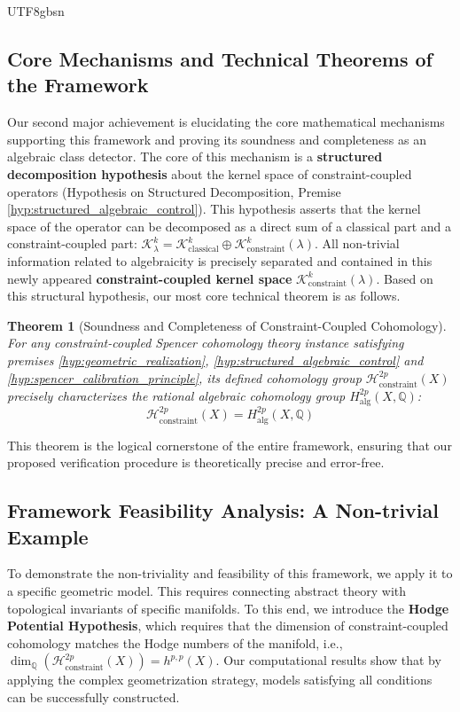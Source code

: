 \documentclass[a4paper,12pt]{extarticle}
\newtheorem{theorem}{Theorem}[section]
\theoremstyle{definition}
\begin{document}
\begin{CJK}{UTF8}{gbsn}
\subsection{Core Mechanisms and Technical Theorems of the Framework}

Our second major achievement is elucidating the core mathematical mechanisms supporting this framework and proving its soundness and completeness as an algebraic class detector. The core of this mechanism is a \textbf{structured decomposition hypothesis} about the kernel space of constraint-coupled operators (Hypothesis on Structured Decomposition, Premise \ref{hyp:structured_algebraic_control}). This hypothesis asserts that the kernel space of the operator can be decomposed as a direct sum of a classical part and a constraint-coupled part: $\mathcal{K}^k_\lambda = \mathcal{K}^k_{\text{classical}} \oplus \mathcal{K}^k_{\text{constraint}}(\lambda)$. All non-trivial information related to algebraicity is precisely separated and contained in this newly appeared \textbf{constraint-coupled kernel space} $\mathcal{K}^k_{\text{constraint}}(\lambda)$. Based on this structural hypothesis, our most core technical theorem is as follows.

\begin{theorem}[Soundness and Completeness of Constraint-Coupled Cohomology]
\label{thm:main_soundness_completeness_final_version}
For any constraint-coupled Spencer cohomology theory instance satisfying premises \ref{hyp:geometric_realization}, \ref{hyp:structured_algebraic_control} and \ref{hyp:spencer_calibration_principle}, its defined cohomology group $\mathcal{H}_{\text{constraint}}^{2p}(X)$ precisely characterizes the rational algebraic cohomology group $H_{\text{alg}}^{2p}(X, \mathbb{Q})$:
\begin{equation}
\mathcal{H}_{\text{constraint}}^{2p}(X) = H_{\text{alg}}^{2p}(X, \mathbb{Q})
\end{equation}
\end{theorem}
This theorem is the logical cornerstone of the entire framework, ensuring that our proposed verification procedure is theoretically precise and error-free.

\subsection{Framework Feasibility Analysis: A Non-trivial Example}

To demonstrate the non-triviality and feasibility of this framework, we apply it to a specific geometric model. This requires connecting abstract theory with topological invariants of specific manifolds. To this end, we introduce the \textbf{Hodge Potential Hypothesis}, which requires that the dimension of constraint-coupled cohomology matches the Hodge numbers of the manifold, i.e., $\dim_{\mathbb{Q}}(\mathcal{H}_{\text{constraint}}^{2p}(X)) = h^{p,p}(X)$. Our computational results show that by applying the complex geometrization strategy, models satisfying all conditions can be successfully constructed.


\end{CJK}
\end{document}
